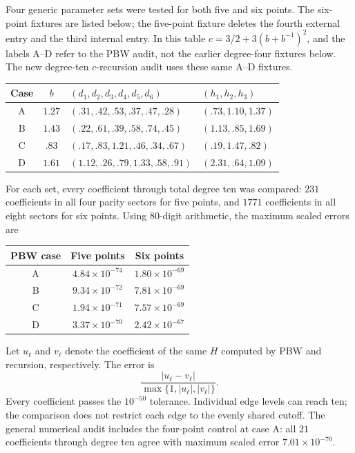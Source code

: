 \documentclass[11pt]{article}
\numberwithin{equation}{section}
\begin{document}
Four generic parameter sets were tested for both five and six points.
The six-point fixtures are listed below; the five-point fixture deletes
the fourth external entry and the third internal entry. In this table
$c=3/2+3(b+b^{-1})^2$, and the labels A--D refer to the PBW audit, not
the earlier degree-four fixtures below. The new degree-ten
$c$-recursion audit uses these same A--D fixtures.
\begin{center}
\small
\begin{tabular}{@{}ccll@{}}
\toprule
Case & $b$ & $(d_1,d_2,d_3,d_4,d_5,d_6)$ & $(h_1,h_2,h_3)$\\
\midrule
A & $1.27$ & $(.31,.42,.53,.37,.47,.28)$ & $(.73,1.10,1.37)$\\
B & $1.43$ & $(.22,.61,.39,.58,.74,.45)$ & $(1.13,.85,1.69)$\\
C & $.83$ & $(.17,.83,1.21,.46,.34,.67)$ & $(.19,1.47,.82)$\\
D & $1.61$ & $(1.12,.26,.79,1.33,.58,.91)$ & $(2.31,.64,1.09)$\\
\bottomrule
\end{tabular}
\end{center}
For each set, every coefficient through total degree ten was compared:
$231$ coefficients in all four parity sectors for five points, and
$1771$ coefficients in all eight sectors for six points. Using 80-digit
arithmetic, the maximum scaled errors are
\begin{center}
\begin{tabular}{@{}ccc@{}}
\toprule
PBW case & Five points & Six points\\
\midrule
A & $4.84\times10^{-74}$ & $1.80\times10^{-69}$\\
B & $9.34\times10^{-72}$ & $7.81\times10^{-69}$\\
C & $1.94\times10^{-71}$ & $7.57\times10^{-69}$\\
D & $3.37\times10^{-70}$ & $2.42\times10^{-67}$\\
\bottomrule
\end{tabular}
\end{center}
Let $u_{\boldsymbol\ell}$ and $v_{\boldsymbol\ell}$ denote the coefficient
of the same $H$ computed by PBW and recursion, respectively. The error is
\begin{equation}
 \frac{|u_{\boldsymbol\ell}-v_{\boldsymbol\ell}|}
 {\max\{1,|u_{\boldsymbol\ell}|,|v_{\boldsymbol\ell}|\}}.
 \label{eq:audit-error}
\end{equation}
Every coefficient passes
the $10^{-50}$ tolerance. Individual edge levels can reach ten; the
comparison does not restrict each edge to the evenly shared cutoff.
The general numerical audit includes the four-point control at case A:
all $21$ coefficients through degree ten agree with maximum scaled
error $7.01\times10^{-70}$.
\end{document}
